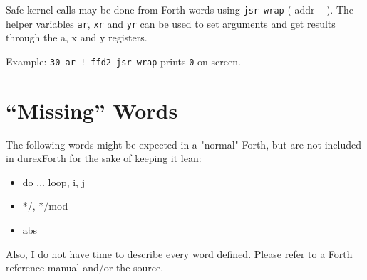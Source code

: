 Safe kernel calls may be done from Forth words using \texttt{jsr-wrap} ( addr -- ). The helper variables \texttt{ar}, \texttt{xr} and \texttt{yr} can be used to set arguments and get results through the a, x and y registers.

Example: \texttt{30 ar ! ffd2 jsr-wrap} prints \texttt{0} on screen.

\section{``Missing'' Words}

The following words might be expected in a "normal" Forth, but are not included in durexForth for the sake of keeping it lean:

\begin{itemize}
\item do ... loop, i, j
\item */, */mod
\item abs
\end{itemize}

Also, I do not have time to describe every word defined. Please refer to a Forth reference manual and/or the source.
